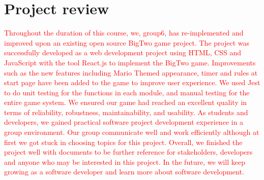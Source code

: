 \documentclass{article}
\begin{document}
\section{Project review}
\textcolor{red}{Throughout the duration of this course, we, group6, has re-implemented and improved upon an existing open source BigTwo game project. The project was successfully developed as a web development project using HTML, CSS and JavaScript with the tool React.js to implement the BigTwo game. Improvements such as the new features including Mario Themed appearance, timer and rules at start page have been added to the game to improve user experience. We used Jest to do unit testing for the functions in each module, and manual testing for the entire game system. We ensured our game had reached an excellent quality in terms of reliability, robustness, maintainability, and usability. As students and developers, we gained practical software project development experience in a group environment. Our group communicate well and work efficiently although at first we got stuck in choosing topics for this project. Overall, we finished the project well with documents to be further reference for stakeholders, developers and anyone who may be interested in this project. In the future, we will keep growing as a software developer and learn more about software development.}
\end{document}
